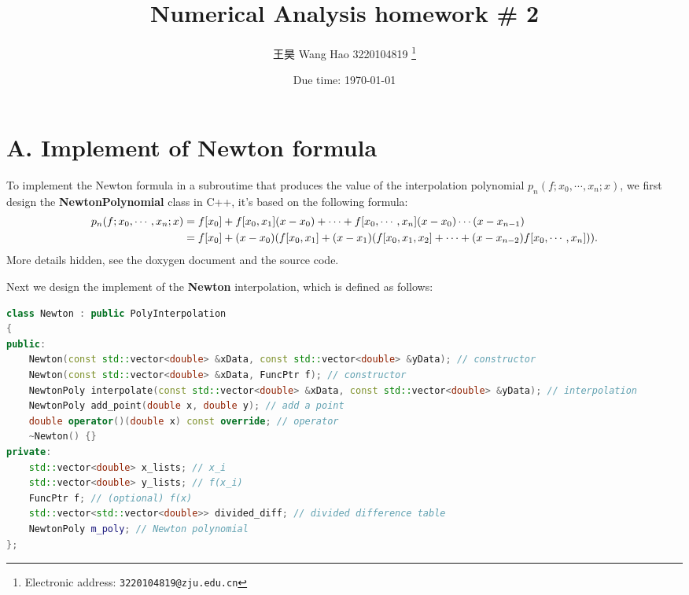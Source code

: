 \documentclass[a4paper]{article}
\begin{document}
\title{Numerical Analysis homework \# 2}

\author{王昊 Wang Hao 3220104819
  \thanks{Electronic address: \texttt{3220104819@zju.edu.cn}}}


\date{Due time: \today}

\maketitle

\section*{A. Implement of Newton formula}

To implement the Newton formula in a subroutime that produces the value of the interpolation polynomial $p_n(f;x_0,\cdots,x_n;x)$, we first design the \textbf{NewtonPolynomial} class in C++, it's based on the following formula:
\begin{equation}
	\begin{aligned}
		p_n(f;x_0,\cdots,x_n;x) &= f[x_0] + f[x_0,x_1](x-x_0) + \cdots + f[x_0,\cdots,x_n](x-x_0)\cdots(x-x_{n-1}) \\
		&= f[x_0] + (x-x_0)\qty(f[x_0,x_1] + (x-x_1)\qty(f[x_0,x_1,x_2] + \cdots + (x-x_{n-2})f[x_0,\cdots,x_n])). 
	\end{aligned}
\end{equation}
More details hidden, see the doxygen document and the source code. 

Next we design the implement of the \textbf{Newton} interpolation, which is defined as follows:
\begin{lstlisting}[language=C++]
class Newton : public PolyInterpolation
{
public:
    Newton(const std::vector<double> &xData, const std::vector<double> &yData); // constructor
    Newton(const std::vector<double> &xData, FuncPtr f); // constructor
    NewtonPoly interpolate(const std::vector<double> &xData, const std::vector<double> &yData); // interpolation
    NewtonPoly add_point(double x, double y); // add a point
    double operator()(double x) const override; // operator
    ~Newton() {}
private:
    std::vector<double> x_lists; // x_i
    std::vector<double> y_lists; // f(x_i)
    FuncPtr f; // (optional) f(x)
    std::vector<std::vector<double>> divided_diff; // divided difference table
    NewtonPoly m_poly; // Newton polynomial
};
\end{lstlisting}
\end{document}
